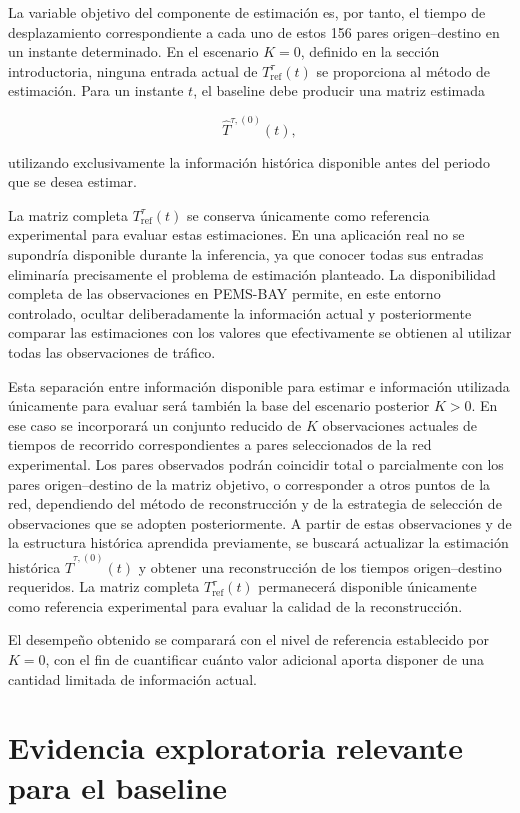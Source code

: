 \documentclass[11pt]{article}
\begin{document}
La variable objetivo del componente de estimación es, por tanto, el tiempo de desplazamiento correspondiente a cada uno de estos 156 pares origen--destino en un instante determinado. En el escenario $K=0$, definido en la sección introductoria, ninguna entrada actual de $T^{\tau}_{\mathrm{ref}}(t)$ se proporciona al método de estimación. Para un instante $t$, el baseline debe producir una matriz estimada

\[
\widehat{T}^{\tau,(0)}(t),
\]

utilizando exclusivamente la información histórica disponible antes del periodo que se desea estimar.

La matriz completa $T^{\tau}_{\mathrm{ref}}(t)$ se conserva únicamente como referencia experimental para evaluar estas estimaciones. En una aplicación real no se supondría disponible durante la inferencia, ya que conocer todas sus entradas eliminaría precisamente el problema de estimación planteado. La disponibilidad completa de las observaciones en PEMS-BAY permite, en este entorno controlado, ocultar deliberadamente la información actual y posteriormente comparar las estimaciones con los valores que efectivamente se obtienen al utilizar todas las observaciones de tráfico.

Esta separación entre información disponible para estimar e información utilizada únicamente para evaluar será también la base del escenario posterior $K>0$. En ese caso se incorporará un conjunto reducido de $K$ observaciones actuales de tiempos de recorrido correspondientes a pares seleccionados de la red experimental. Los pares observados podrán coincidir total o parcialmente con los pares origen--destino de la matriz objetivo, o corresponder a otros puntos de la red, dependiendo del método de reconstrucción y de la estrategia de selección de observaciones que se adopten posteriormente. A partir de estas observaciones y de la estructura histórica aprendida previamente, se buscará actualizar la estimación histórica $\widehat{T}^{\tau,(0)}(t)$ y obtener una reconstrucción de los tiempos origen--destino requeridos. La matriz completa $T^\tau_{\mathrm{ref}}(t)$ permanecerá disponible únicamente como referencia experimental para evaluar la calidad de la reconstrucción.

El desempeño obtenido se comparará con el nivel de referencia establecido por $K=0$, con el fin de cuantificar cuánto valor adicional aporta disponer de una cantidad limitada de información actual.

\section{Evidencia exploratoria relevante para el baseline}
\end{document}
